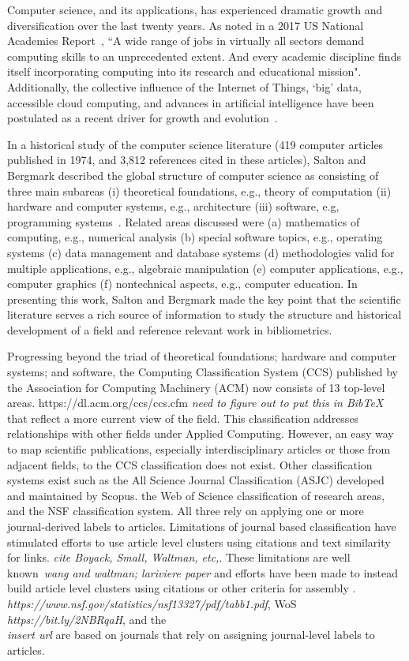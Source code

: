 %
Computer science, and its applications, has experienced dramatic growth and diversification over the last twenty years. As noted in a 2017 US National Academies Report~\cite{nas_2017}, ``A wide range of jobs in virtually all sectors demand computing skills to an unprecedented extent. And every academic discipline finds itself incorporating computing into its research and educational mission". Additionally, the collective influence of the Internet of Things, `big' data, accessible cloud computing, and advances in artificial intelligence have been postulated as a recent driver for growth and evolution~\cite{siebel2019_digital}. 

In a historical study of the computer science literature (419 computer articles published in 1974,  and 3,812 references cited in these articles), Salton and Bergmark described the global structure of computer science as consisting of three main subareas (i) theoretical foundations, e.g., theory of computation (ii) hardware and computer systems, e.g., architecture (iii) software, e.g, programming systems~\cite{salton_citation_1979}.  Related areas discussed were  (a) mathematics of computing, e.g., numerical analysis (b) special software topics, e.g., operating systems (c) data management and database systems (d) methodologies valid for multiple applications, e.g., algebraic manipulation (e) computer applications, e.g., computer graphics (f) nontechnical aspects, e.g., computer education. In presenting this work, Salton and Bergmark made the key point that the scientific literature serves a rich source of information to study the structure and historical development of a field and reference relevant work in bibliometrics.

Progressing beyond the triad of theoretical foundations; hardware and computer systems; and software, the Computing Classification System (CCS) published by the Association for Computing Machinery (ACM) now consists of 13 top-level areas. https://dl.acm.org/ccs/ccs.cfm \emph{need to figure out to put this in BibTeX} that reflect a more current view of the field. This classification addresses relationships with other fields under Applied Computing. However, an easy way to map scientific publications, especially interdisciplinary articles or those from adjacent fields, to the CCS classification does not exist. Other classification systems exist such as the All Science Journal Classification (ASJC) developed and maintained by Scopus. the Web of Science classification of research areas, and the NSF classification system. All three rely on applying one or more journal-derived labels to articles. Limitations of journal based classification have stimulated efforts to use article level clusters using citations and text similarity for links. \emph{cite Boyack, Small, Waltman, etc,}. These limitations are well known~\emph{wang and waltman; lariviere paper} and efforts have been made to instead build article level clusters using citations or other criteria for assembly .
\emph{https://www.nsf.gov/statistics/nsf13327/pdf/tabb1.pdf}, WoS \\ 
\emph{https://bit.ly/2NBRqaH}, and the  
\\ \emph{insert url} are based on journals that rely on assigning journal-level labels to articles. 

